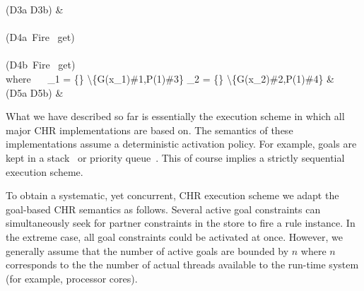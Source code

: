 \documentclass{tlp}
\begin{document}
{{{{{{       \mbox{(D3a} \mid\mid \mbox{D3b)} \sgap \partranssf{\{\} \backslash \{\}} 
          & 
      \ea \\ \\
       \mbox{(D4a Fire } get) \sgap {}
           \\
       \sgap \mid\mid \sgap \\      
       \mbox{(D4b Fire } get) \sgap {}  \\
        \mbox{where} ~~ \delta_1 = \{\} \backslash \{G(x_1)\#1,P(1)\#3\} \sgap
       \delta_2 = \{\} \backslash \{G(x_2)\#2,P(1)\#4\} 
      \ea
     \ea
    }
    {
     {
          &  \\
       \mbox{(D5a} \mid\mid \mbox{D5b)} \sgap \partranssf{\{\} \backslash \{\}} & 
      \ea
     }
    }
   }
  }
 }
\ea
\eda
}
}

What we have described so far is essentially the execution scheme in which all 
major CHR implementations are based on. 
The semantics of these implementations assume a deterministic activation policy.
For example, goals are kept in a stack~\cite{DuckSBH04}
or priority queue~\cite{rp-chr}. This of course implies a strictly sequential
execution scheme.

To obtain a systematic, yet concurrent, CHR execution scheme we adapt
the goal-based CHR semantics as follows. Several active goal constraints
can simultaneously 
seek for partner constraints in the store to fire a rule instance. In the extreme 
case, all goal constraints could be activated at once. However, we generally assume 
that the number of active goals are bounded by $n$ where $n$ corresponds to 
the the number of actual threads available to the run-time system (for example, processor cores).
\end{document}
